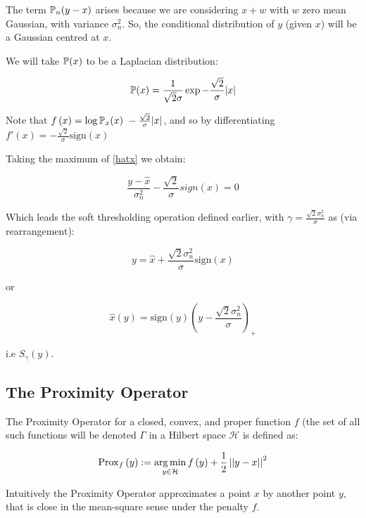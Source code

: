 \documentclass{article}
\begin{document}
The term \({\mathbb{P}}_{n}{\left(y-x\right)}\) arises because we are considering \(x+w\) with \(w\) zero mean Gaussian, with variance \(\sigma_n^2\). So, the conditional distribution of \(y\) (given \(x\)) will be a Gaussian centred at \(x\).

We will take \({\mathbb{P}}{\left(x\right)}\) to be a Laplacian distribution:

\begin{equation}
{\mathbb{P}}{\left(x\right)} = \frac{1}{\sqrt{2}\sigma}\exp{-\frac{\sqrt{2}}{\sigma}|x|}
\end{equation}

Note that \( f\left(x\right) = \log{{\mathbb{P}}_x{ \left( x \right)}} ~ -\frac{\sqrt{2}}{\sigma} |x| \), and so by differentiating \( f'\left(x\right) = -\frac{\sqrt{2}}{\sigma} \mathrm{sign}\left(x\right) \)

Taking the maximum of \ref{hatx} we obtain:

\begin{equation}
\frac{y-\hat{x}}{\sigma^2_n}-\frac{\sqrt{2}}{\sigma}sign(x) = 0
\end{equation}

Which leads the soft thresholding operation defined earlier, with \(\gamma = \frac{\sqrt{2}\sigma^2_n}{\sigma}\) as (via rearrangement):

$$
y =  \hat{x} + \frac{\sqrt{2}\sigma^2_n}{\sigma}\mathrm{sign}\left(x\right)
$$

or

$$
\hat{x}\left(y\right) = \mathrm{sign}(y)\left(y - \frac{\sqrt{2}\sigma^2_n}{\sigma}\right)_+
$$

i.e \(S_\gamma(y)\).

\subsection{The Proximity Operator}
The Proximity Operator for a closed, convex, and proper function \(f\) (the set of all such functions will be denoted \(\Gamma\) in a Hilbert space \(\mathcal{H}\) is defined as:

\begin{definition}
\begin{equation}
\mathrm{Prox}_f\left(y\right) :=  \operatorname*{arg\,min}_{y \in \mathcal{H} } f\left(y\right) + \frac{1}{2}\left|\left|y-x\right|\right|^2
\end{equation}
\end{definition}

Intuitively the Proximity Operator approximates a point \(x\) by another point \(y\), that is close in the mean-square sense under the penalty \(f\).
\end{document}
